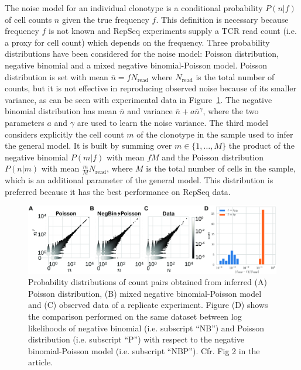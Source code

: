 \documentclass[a4paper,twocolumn]{article}
\begin{document}
The noise model for an individual clonotype is a conditional probability $P(n|f)$ of cell counts $n$ given the true frequency $f$. This definition is necessary because frequency $f$ is not known and RepSeq experiments supply a TCR read count (i.e. a proxy for cell count) which depends on the frequency.
Three probability distributions have been considered for the noise model: Poisson distribution, negative binomial and a mixed negative binomial-Poisson model. Poisson distribution is set with mean $\bar{n} = f N_\mathrm{read}$ where $N_\mathrm{read}$ is the total number of counts, but it is not effective in reproducing observed noise because of its smaller variance, as can be seen with experimental data in Figure~\ref{fig:noise}. The negative binomial distribution has mean $\bar{n}$ and variance $\bar{n} + a \bar{n}^\gamma$, where the two parameters $a$ and $\gamma$ are used to learn the noise variance. The third model considers explicitly the cell count $m$ of the clonotype in the sample used to infer the general model. It is built by summing over $m \in \{1, \dots, M\}$ the product of the negative binomial $P(m|f)$ with mean $f M$ and the Poisson distribution $P(n|m)$ with mean $\frac{m}{M} N_\mathrm{read}$, where $M$ is the total number of cells in the sample, which is an additional parameter of the general model. This distribution is preferred because it has the best performance on RepSeq data.
\begin{figure}[ht]
  \centering
  \includegraphics*[keepaspectratio=true,width=\textwidth]{./report/pcbi.1007873.g002}
  \caption{Probability distributions of count pairs obtained from inferred (A) Poisson distribution, (B) mixed negative binomial-Poisson model and (C) observed data of a replicate experiment. Figure (D) shows the comparison performed on the same dataset between log likelihoods of negative binomial (i.e. subscript ``NB'') and Poisson distribution (i.e. subscript ``P'') with respect to the negative binomial-Poisson model (i.e. subscript ``NBP''). Cfr. Fig 2 in the article.}
  \label{fig:noise}
\end{figure}
\end{document}
